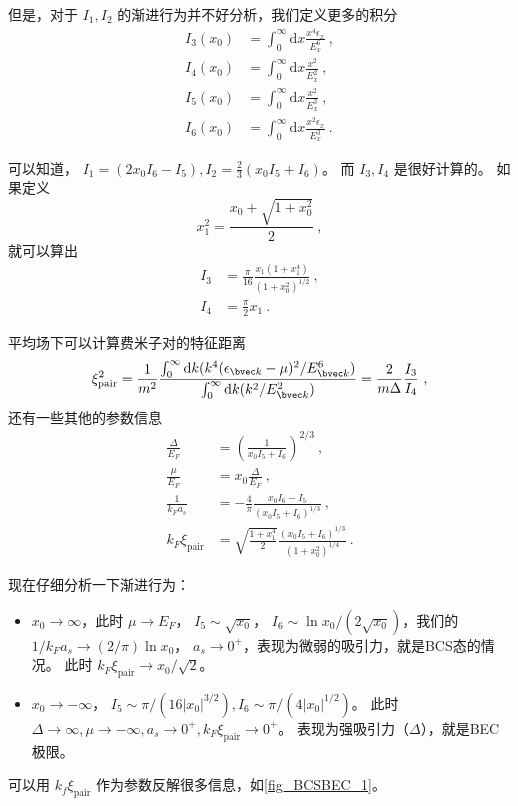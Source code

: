 但是，对于 $I_1, I_2$ 的渐进行为并不好分析，我们定义更多的积分
\begin{equation}
\begin{aligned}
I_3(x_0) &=\int_0^\infty\text{d}x\frac{x^4\epsilon_x}{E_x^6}~,\\
I_4(x_0) &=\int_0^\infty\text{d}x\frac{x^2}{E_x^2}~,\\
I_5(x_0) &=\int_0^\infty\text{d}x\frac{x^2}{E_x^3}~,\\
I_6(x_0) &=\int_0^\infty\text{d}x\frac{x^2\epsilon_x}{E_x^3}~.
\end{aligned}
\end{equation}

可以知道， $I_1=(2x_0I_6-I_5),I_2 = \frac{2}{3}(x_0I_5+I_6)$。 而 $I_3,I_4$ 是很好计算的。 如果定义
\begin{equation}
x_1^2=\frac{x_0+\sqrt{1+x_0^2}}{2}~,
\end{equation}
就可以算出
\begin{equation}
\begin{aligned}
I_3&=\frac{\pi}{16}\frac{x_1(1+x_1^4)}{(1+x_0^2)^{1/2}}~,\\
I_4&=\frac{\pi}{2}x_1~.
\end{aligned}
\end{equation}

平均场下可以计算费米子对的特征距离
\begin{equation}
\xi_{\text{pair}}^2 = \frac{1}{m^2}\frac{\int_0^\infty\text{d}k(k^4(\epsilon_{\bvec k}-\mu)^2/E_{\bvec k}^6)}{\int_0^\infty\text{d}k(k^2/E_{\bvec k}^2)} = \frac{2}{m\Delta}\frac{I_3}{I_4}~,
\end{equation}
还有一些其他的参数信息
\begin{equation}
\begin{aligned}
\frac{\Delta}{E_F} &= \left(\frac{1}{x_0I_5+I_6}\right)^{2/3}~,\\
\frac{\mu}{E_F} &= x_0\frac{\Delta}{E_F}~,\\
\frac{1}{k_Fa_s} &= -\frac{4}{\pi}\frac{x_0I_6-I_5}{(x_0I_5+I_6)^{1/3}}~,\\
k_F\xi_{\text{pair}} &= \sqrt{\frac{1+x_1^4}{2}}\frac{(x_0I_5+I_6)^{1/3}}{(1+x_0^2)^{1/4}}~.
\end{aligned}
\end{equation}

现在仔细分析一下渐进行为：

\begin{itemize}
\item $x_0\to\infty$，此时 $\mu\to E_F$， $I_5\sim\sqrt{x_0}$， $I_6\sim\ln x_0/(2\sqrt{x_0})$，我们的 $1/k_Fa_s\to(2/\pi)\ln x_0$， $a_s\to0^+$，表现为微弱的吸引力，就是BCS态的情况。 此时 $k_F\xi_{\text{pair}}\to x_0/\sqrt2$。
\item $x_0\to-\infty$， $I_5\sim\pi/(16|x_0|^{3/2}), I_6\sim\pi/(4|x_0|^{1/2})$。 此时 $\Delta\to\infty, \mu\to-\infty, a_s\to0^+,k_F\xi_{\text{pair}}\to0^+$。 表现为强吸引力（$\Delta$），就是BEC极限。
\end{itemize}

可以用 $k_f\xi_{\text{pair}}$ 作为参数反解很多信息，如\autoref{fig_BCSBEC_1}。
